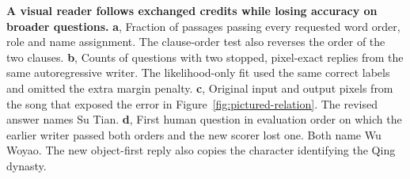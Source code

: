 \textbf{A visual reader follows exchanged credits while losing accuracy on broader questions.}
\textbf{a}, Fraction of passages passing every requested word order, role and name assignment. The clause-order test also reverses the order of the two clauses.
\textbf{b}, Counts of questions with two stopped, pixel-exact replies from the same autoregressive writer. The likelihood-only fit used the same correct labels and omitted the extra margin penalty.
\textbf{c}, Original input and output pixels from the song that exposed the error in Figure~\ref{fig:pictured-relation}. The revised answer names Su Tian.
\textbf{d}, First human question in evaluation order on which the earlier writer passed both orders and the new scorer lost one. Both name Wu Woyao. The new object-first reply also copies the character identifying the Qing dynasty.

